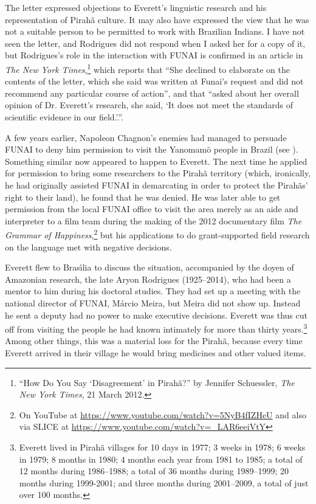 \documentclass[output=paper,colorlinks,citecolor=brown
]{langscibook}
\begin{document}
The letter expressed objections to Everett's linguistic research
and his representation of Pirah{\~a} culture.  It may also have
expressed the view that he was not a suitable person to be permitted
to work with Brazilian Indians. I have not seen the letter, and
Rodrigues did not respond when I asked her for a copy of it, but
Rodrigues's role in the interaction with FUNAI is confirmed in an
article in \textit{The New York Times},\footnote{\label{schuessler}
   ``How Do You Say `Disagreement' in Pirah{\~a}?'' by Jennifer
   Schuessler, \textit{The New York Times}, 21 March 2012.}
which reports that ``She declined to elaborate on the contents of the
letter, which she said was written at Funai's request and did not
recommend any particular course of action'', and that ``asked about
her overall opinion of Dr. Everett’s research, she said, `It does not
meet the standards of scientific evidence in our field.'.''.

A few years earlier, Napoleon Chagnon's enemies had managed to persuade
FUNAI to deny him permission to visit the Yanomam{\"o} people in Brazil
(see \citealt{Dreger11}).
Something similar now appeared to happen to Everett. The next time he
applied for permission to bring some researchers to the Pirah{\~a}
territory (which, ironically, he had originally assisted FUNAI in
demarcating in order to protect the Pirah{\~a}s' right to their
land), he found that he was denied. He was later able to get permission
from the local FUNAI office to visit the area merely as an aide and
interpreter to a film team during the making of the 2012 documentary
film \textit{The Grammar of Happiness},\footnote{\label{happiness}
   On YouTube at \url{https://www.youtube.com/watch?v=5NyB4fIZHeU} and
   also via SLICE at \url{https://www.youtube.com/watch?v=_LAR6eeiVtY}}
but his applications to do grant-supported field research on the language
met with negative decisions.

Everett flew to Bras{\'\i}lia to discuss the situation, accompanied by
the doyen of Amazonian research, the late Aryon Rodrigues (1925--2014),
who had been a mentor to him during his doctoral studies. They had set
up a meeting with the national director of FUNAI, M{\'a}rcio Meira, but
Meira did not show up. Instead he sent a deputy had no power to make
executive decisions. Everett was thus cut off from visiting the people
he had known intimately for more than thirty
years.\footnote{\label{residence}
   Everett lived in Pirah{\~a} villages for 10 days in 1977; 3 weeks
   in 1978; 6 weeks in 1979; 8 months in 1980; 4 months each year
   from 1981 to 1985; a total of 12 months during 1986--1988; a total
   of 36 months during 1989--1999; 20 months during 1999-2001; and
   three months during 2001--2009, a total of just over 100 months.}
Among other things, this was a material loss for the Pirah{\~a},
because every time Everett arrived in their village he would bring
medicines and other valued items.
\end{document}
